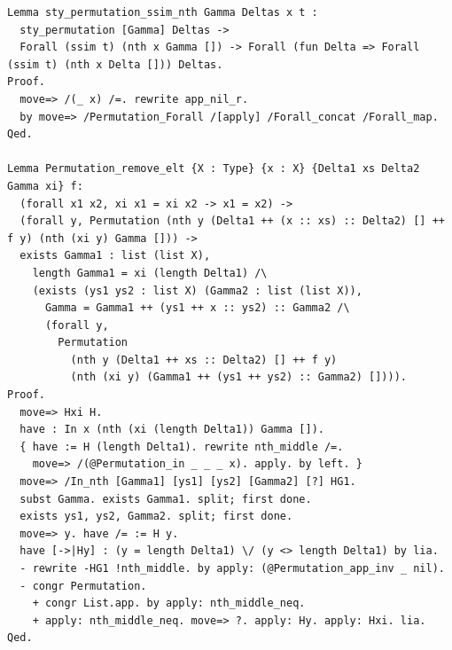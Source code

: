 \documentclass[10pt,a4paper]{article}
\begin{document}
\begin{lstlisting}[style=authorcoq]
Lemma sty_permutation_ssim_nth Gamma Deltas x t :
  sty_permutation [Gamma] Deltas ->
  Forall (ssim t) (nth x Gamma []) -> Forall (fun Delta => Forall (ssim t) (nth x Delta [])) Deltas.
Proof.
  move=> /(_ x) /=. rewrite app_nil_r.
  by move=> /Permutation_Forall /[apply] /Forall_concat /Forall_map.
Qed.

Lemma Permutation_remove_elt {X : Type} {x : X} {Delta1 xs Delta2 Gamma xi} f:
  (forall x1 x2, xi x1 = xi x2 -> x1 = x2) ->
  (forall y, Permutation (nth y (Delta1 ++ (x :: xs) :: Delta2) [] ++ f y) (nth (xi y) Gamma [])) ->
  exists Gamma1 : list (list X),
    length Gamma1 = xi (length Delta1) /\
    (exists (ys1 ys2 : list X) (Gamma2 : list (list X)),
      Gamma = Gamma1 ++ (ys1 ++ x :: ys2) :: Gamma2 /\
      (forall y,
        Permutation
          (nth y (Delta1 ++ xs :: Delta2) [] ++ f y)
          (nth (xi y) (Gamma1 ++ (ys1 ++ ys2) :: Gamma2) []))).
Proof.
  move=> Hxi H.
  have : In x (nth (xi (length Delta1)) Gamma []).
  { have := H (length Delta1). rewrite nth_middle /=.
    move=> /(@Permutation_in _ _ _ x). apply. by left. }
  move=> /In_nth [Gamma1] [ys1] [ys2] [Gamma2] [?] HG1.
  subst Gamma. exists Gamma1. split; first done.
  exists ys1, ys2, Gamma2. split; first done.
  move=> y. have /= := H y.
  have [->|Hy] : (y = length Delta1) \/ (y <> length Delta1) by lia.
  - rewrite -HG1 !nth_middle. by apply: (@Permutation_app_inv _ nil).
  - congr Permutation.
    + congr List.app. by apply: nth_middle_neq.
    + apply: nth_middle_neq. move=> ?. apply: Hy. apply: Hxi. lia.
Qed.


\end{lstlisting}
\end{document}
